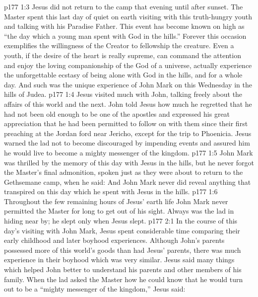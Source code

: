 \vs p177 1:3 Jesus did not return to the camp that evening until after sunset. The Master spent this last day of quiet on earth visiting with this truth\hyp{}hungry youth and talking with his Paradise Father. This event has become known on high as “the day which a young man spent with God in the hills.” Forever this occasion exemplifies the willingness of the Creator to fellowship the creature. Even a youth, if the desire of the heart is really supreme, can command the attention and enjoy the loving companionship of the God of a universe, actually experience the unforgettable ecstasy of being alone with God in the hills, and for a whole day. And such was the unique experience of John Mark on this Wednesday in the hills of Judea.
\vs p177 1:4 Jesus visited much with John, talking freely about the affairs of this world and the next. John told Jesus how much he regretted that he had not been old enough to be one of the apostles and expressed his great appreciation that he had been permitted to follow on with them since their first preaching at the Jordan ford near Jericho, except for the trip to Phoenicia. Jesus warned the lad not to become discouraged by impending events and assured him he would live to become a mighty messenger of the kingdom.
\vs p177 1:5 John Mark was thrilled by the memory of this day with Jesus in the hills, but he never forgot the Master’s final admonition, spoken just as they were about to return to the Gethsemane camp, when he said:  And John Mark never did reveal anything that transpired on this day which he spent with Jesus in the hills.
\vs p177 1:6 Throughout the few remaining hours of Jesus’ earth life John Mark never permitted the Master for long to get out of his sight. Always was the lad in hiding near by; he slept only when Jesus slept.
\vs p177 2:1 In the course of this day’s visiting with John Mark, Jesus spent considerable time comparing their early childhood and later boyhood experiences. Although John’s parents possessed more of this world’s goods than had Jesus’ parents, there was much experience in their boyhood which was very similar. Jesus said many things which helped John better to understand his parents and other members of his family. When the lad asked the Master how he could know that he would turn out to be a “mighty messenger of the kingdom,” Jesus said:
